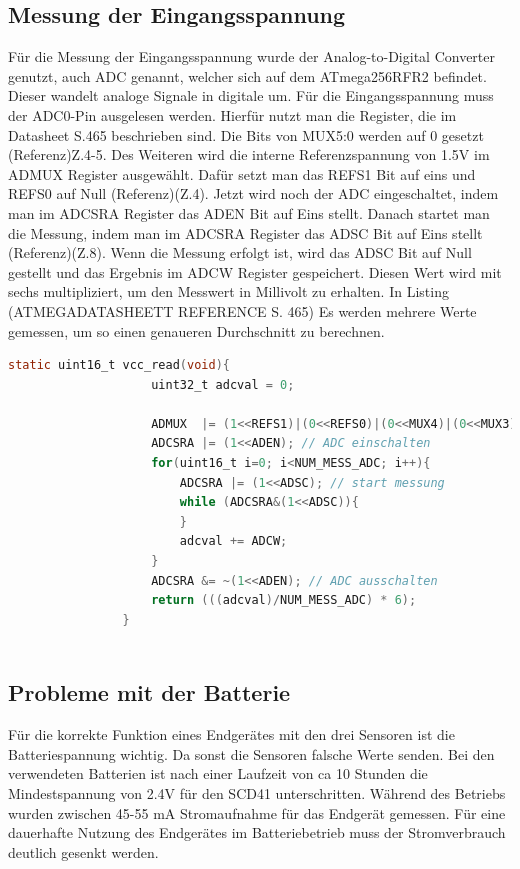 \documentclass[]{article}
\begin{document}
					
			\subsection{Messung der Eingangsspannung}
			Für die Messung der Eingangsspannung wurde der Analog-to-Digital Converter genutzt, auch ADC genannt, welcher sich auf dem ATmega256RFR2 befindet. Dieser wandelt analoge Signale in digitale um. Für die Eingangsspannung muss der ADC0-Pin ausgelesen werden. Hierfür nutzt man die Register, die im Datasheet S.465 beschrieben sind. Die Bits von MUX5:0 werden auf 0 gesetzt (Referenz)Z.4-5. Des Weiteren wird die interne Referenzspannung von 1.5V im ADMUX Register ausgewählt. Dafür setzt man das REFS1 Bit auf eins und REFS0 auf Null (Referenz)(Z.4). Jetzt wird noch der ADC eingeschaltet, indem man im ADCSRA Register das ADEN Bit auf Eins stellt. Danach startet man die Messung, indem man im ADCSRA Register das ADSC Bit auf Eins stellt (Referenz)(Z.8). Wenn die Messung erfolgt ist, wird das ADSC Bit auf Null gestellt und das Ergebnis im ADCW Register gespeichert. Diesen Wert wird mit sechs multipliziert, um den Messwert in Millivolt zu erhalten. In Listing (ATMEGADATASHEETT REFERENCE S. 465)
			Es werden mehrere Werte gemessen, um so einen genaueren Durchschnitt zu berechnen.
			
			\begin{lstlisting}[language=C,frame=single, caption = Delay Timer, label = delay_timer] 
				static uint16_t vcc_read(void){
					uint32_t adcval = 0;
					
					ADMUX  |= (1<<REFS1)|(0<<REFS0)|(0<<MUX4)|(0<<MUX3)|(0<<MUX2)|(0<<MUX1)|(0<<MUX0);			ADCSRB |= (0<<MUX5);
					ADCSRA |= (1<<ADEN); // ADC einschalten
					for(uint16_t i=0; i<NUM_MESS_ADC; i++){
						ADCSRA |= (1<<ADSC); // start messung
						while (ADCSRA&(1<<ADSC)){
						}
						adcval += ADCW;
					}
					ADCSRA &= ~(1<<ADEN); // ADC ausschalten
					return (((adcval)/NUM_MESS_ADC) * 6);
				}
				
			\end{lstlisting}
			\subsection{Probleme mit der Batterie}
			Für die korrekte Funktion eines Endgerätes mit den drei Sensoren ist die Batteriespannung wichtig. Da sonst die Sensoren falsche Werte senden. Bei den verwendeten Batterien ist nach einer Laufzeit von ca 10 Stunden die Mindestspannung von 2.4V für den SCD41 unterschritten. Während des Betriebs wurden zwischen 45-55 mA Stromaufnahme für das Endgerät gemessen. Für eine dauerhafte Nutzung des Endgerätes im Batteriebetrieb muss der Stromverbrauch deutlich gesenkt werden.
\end{document}
